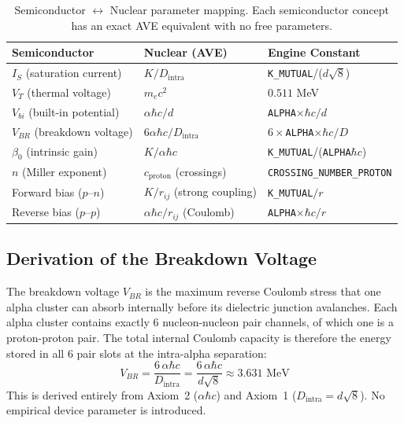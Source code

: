 \begin{table}[htbp]
\centering
\caption{Semiconductor $\leftrightarrow$ Nuclear parameter mapping. Each semiconductor concept has an exact AVE equivalent with no free parameters.}
\label{tab:semi_nuclear_map}
\begin{tabularx}{\textwidth}{@{}l l X@{}}
\hline
\textbf{Semiconductor} & \textbf{Nuclear (AVE)} & \textbf{Engine Constant} \\
\hline
$I_S$ (saturation current) & $K / D_\text{intra}$ & \texttt{K\_MUTUAL}/($d\sqrt{8}$) \\
$V_T$ (thermal voltage) & $m_e c^2$ & $0.511$ MeV \\
$V_{bi}$ (built-in potential) & $\alpha\hbar c / d$ & \texttt{ALPHA}$\times\hbar c / d$ \\
$V_{BR}$ (breakdown voltage) & $6\alpha\hbar c / D_\text{intra}$ & $6 \times$\texttt{ALPHA}$\times\hbar c / D$ \\
$\beta_0$ (intrinsic gain) & $K / \alpha\hbar c$ & \texttt{K\_MUTUAL}/(\texttt{ALPHA}$\hbar c$) \\
$n$ (Miller exponent) & $c_\text{proton}$ (crossings) & \texttt{CROSSING\_NUMBER\_PROTON} \\
Forward bias ($p$--$n$) & $K/r_{ij}$ (strong coupling) & \texttt{K\_MUTUAL}$/r$ \\
Reverse bias ($p$--$p$) & $\alpha\hbar c / r_{ij}$ (Coulomb) & \texttt{ALPHA}$\times\hbar c / r$ \\
\hline
\end{tabularx}
\end{table}

\subsection{Derivation of the Breakdown Voltage}

The breakdown voltage $V_{BR}$ is the maximum reverse Coulomb stress that one alpha cluster can absorb internally before its dielectric junction avalanches. Each alpha cluster contains exactly 6 nucleon-nucleon pair channels, of which one is a proton-proton pair. The total internal Coulomb capacity is therefore the energy stored in all 6 pair slots at the intra-alpha separation:
\begin{equation}
    V_{BR} = \frac{6 \, \alpha\hbar c}{D_\text{intra}} = \frac{6 \, \alpha\hbar c}{d\sqrt{8}} \approx 3.631 \text{ MeV}
    \label{eq:V_BR}
\end{equation}
This is derived entirely from Axiom~2 ($\alpha\hbar c$) and Axiom~1 ($D_\text{intra} = d\sqrt{8}$). No empirical device parameter is introduced.

